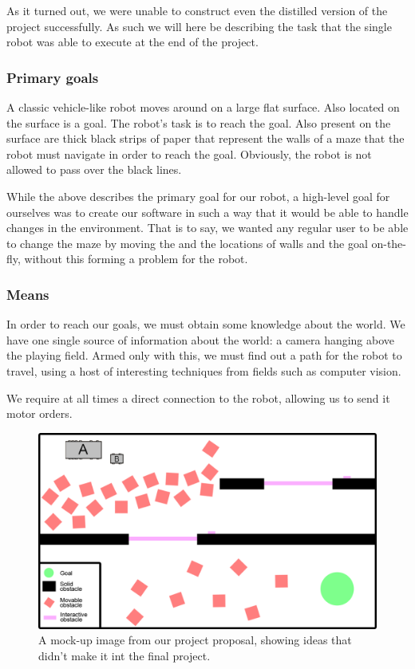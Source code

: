 \documentclass[10pt, abstracton, twocolumn]{scrartcl}
\begin{document}
As it turned out, we were unable to construct even the distilled version of the project successfully. As such we will here be describing the task that the single robot was able to execute at the end of the project.

\subsubsection{Primary goals}
A classic vehicle-like robot moves around on a large flat surface. Also located on the surface is a goal. The robot's task is to reach the goal. Also present on the surface are thick black strips of paper that represent the walls of a maze that the robot must navigate in order to reach the goal. Obviously, the robot is not allowed to pass over the black lines.

While the above describes the primary goal for our robot, a high-level goal for ourselves was to create our software in such a way that it would be able to handle changes in the environment. That is to say, we wanted any regular user to be able to change the maze by moving the and the locations of walls and the goal on-the-fly, without this forming a problem for the robot.

\subsubsection{Means}

In order to reach our goals, we must obtain some knowledge about the world. We have one single source of information about the world: a camera hanging above the playing field. Armed only with this, we must find out a path for the robot to travel, using a host of interesting techniques from fields such as computer vision.

We require at all times a direct connection to the robot, allowing us to send it motor orders.

\begin{figure}
        \centering
        \includegraphics[width=\columnwidth]{pictures/proposalImage.png}
        \caption{\small A mock-up image from our project proposal, showing ideas that didn't make it int the final project.}
        \label{fig:proposal}
\end{figure}
\end{document}
